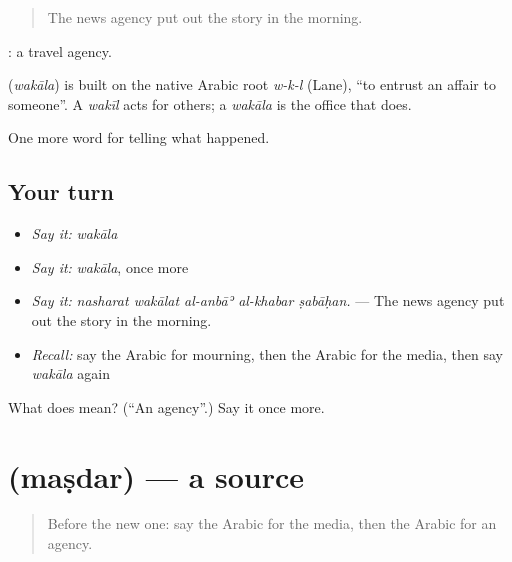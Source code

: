 \begin{quote}
The news agency put out the story in the morning.
\end{quote}

 : a travel agency.

\begin{cousinweb}
\textbf{} (\emph{wakāla}) is built on the native Arabic root \emph{w-k-l} (Lane), \textquotedblleft{}to entrust an affair to someone\textquotedblright{}. A \emph{wakīl} acts for others; a \emph{wakāla} is the office that does.
\end{cousinweb}

\begin{grammarlens}[title={What you've built}]
One more word for telling what happened.
\end{grammarlens}

\subsection*{Your turn}
\begin{itemize}
\raggedright
  \item \emph{Say it:} \emph{wakāla}
  \item \emph{Say it:} \emph{wakāla}, once more
  \item \emph{Say it:} \emph{nasharat wakālat al-anbāʾ al-khabar ṣabāḥan.} — The news agency put out the story in the morning.
  \item \emph{Recall:} say the Arabic for mourning, then the Arabic for the media, then say \emph{wakāla} again
\end{itemize}

\begin{tcolorbox}[breakable,colback=teal!4,colframe=teal!35!black,title={Before you move on}]
What does  mean? (\textquotedblleft{}An agency\textquotedblright{}.) Say it once more.
\end{tcolorbox}
\section[\texorpdfstring{\ar{مصدر} (maṣdar)}{مصدر (maṣdar)}]{ (maṣdar) — a source}

\label{lesson:AR-C320-masdar}



\begin{quote}
Before the new one: say the Arabic for the media, then the Arabic for an agency.
\end{quote}

